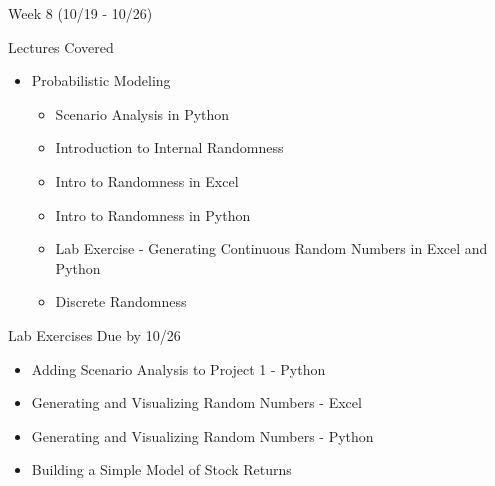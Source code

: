 \documentclass[]{article}
\begin{document}
\begin{section}{Week 8 (10/19 - 10/26)}
\begin{subsection}{Lectures Covered}
\begin{itemize}
\item Probabilistic Modeling
\begin{itemize}
\item Scenario Analysis in Python
\item Introduction to Internal Randomness
\item Intro to Randomness in Excel
\item Intro to Randomness in Python
\item Lab Exercise - Generating Continuous Random Numbers in Excel and Python
\item Discrete Randomness
\end{itemize}
\end{itemize}
\end{subsection}
\begin{subsection}{Lab Exercises Due by 10/26}
\begin{itemize}
\item Adding Scenario Analysis to Project 1 - Python
\item Generating and Visualizing Random Numbers - Excel
\item Generating and Visualizing Random Numbers - Python
\item Building a Simple Model of Stock Returns
\end{itemize}
\end{subsection}
\end{section}
\end{document}
